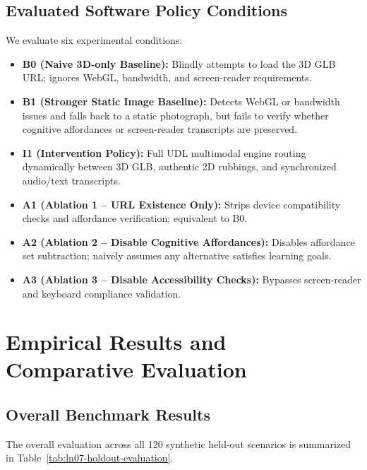 \documentclass[11pt,a4paper]{article}
\begin{document}
\subsection{Evaluated Software Policy Conditions}
We evaluate six experimental conditions:
\begin{itemize}
    \item \textbf{B0 (Naive 3D-only Baseline):} Blindly attempts to load the 3D GLB URL; ignores WebGL, bandwidth, and screen-reader requirements.
    \item \textbf{B1 (Stronger Static Image Baseline):} Detects WebGL or bandwidth issues and falls back to a static photograph, but fails to verify whether cognitive affordances or screen-reader transcripts are preserved.
    \item \textbf{I1 (Intervention Policy):} Full UDL multimodal engine routing dynamically between 3D GLB, authentic 2D rubbings, and synchronized audio/text transcripts.
    \item \textbf{A1 (Ablation 1 -- URL Existence Only):} Strips device compatibility checks and affordance verification; equivalent to B0.
    \item \textbf{A2 (Ablation 2 -- Disable Cognitive Affordances):} Disables affordance set subtraction; naively assumes any alternative satisfies learning goals.
    \item \textbf{A3 (Ablation 3 -- Disable Accessibility Checks):} Bypasses screen-reader and keyboard compliance validation.
\end{itemize}

\section{Empirical Results and Comparative Evaluation}

\subsection{Overall Benchmark Results}
The overall evaluation across all 120 synthetic held-out scenarios is summarized in Table~\ref{tab:ln07-holdout-evaluation}.


\end{document}
